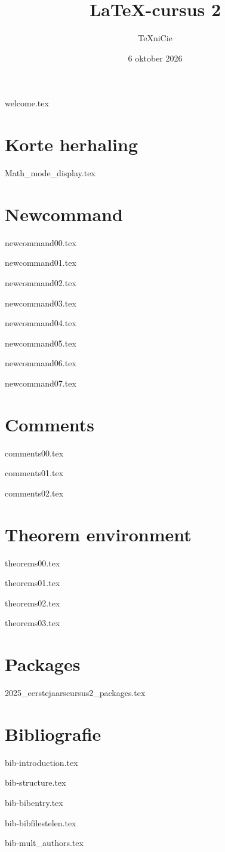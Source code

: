 \documentclass[allauthors,dutch]{../../../cursuspresentatie3}
\title{\LaTeX{}-cursus 2}
\author{\TeX niCie}
\date{6 oktober 2026}
\def\importslidei#1#2{%
	{#2}
}
\def\importslideh#1#2{%
	{#2}
}
\def\importslidej#1#2{%
	{#2}
}
\def\importslidey#1#2{%
	{#2}
}
\begin{document}
\importslideh{beginners_NL}{welcome.tex}

\section{Korte herhaling}
\def\placetarget{\hypertarget{herhaling}{}}

\importslidei{2025-eerstejaars_cursus_1}{Math_mode_display.tex}

\section{Newcommand}
\def\placetarget{\hypertarget{newcommand}{}}

\importslidey{2026-eerstejaars_cursus_2}{newcommand00.tex}
\importslidey{2026-eerstejaars_cursus_2}{newcommand01.tex}
\importslidey{2026-eerstejaars_cursus_2}{newcommand02.tex}
\importslidey{2026-eerstejaars_cursus_2}{newcommand03.tex}
\importslidey{2026-eerstejaars_cursus_2}{newcommand04.tex}
\importslidey{2026-eerstejaars_cursus_2}{newcommand05.tex}
\importslidey{2026-eerstejaars_cursus_2}{newcommand06.tex}
\importslidey{2026-eerstejaars_cursus_2}{newcommand07.tex}

\section{Comments}
\def\placetarget{\hypertarget{comments}{}}

\importslidey{2026-eerstejaars_cursus_2}{comments00.tex}
\importslidey{2026-eerstejaars_cursus_2}{comments01.tex}
\importslidey{2026-eerstejaars_cursus_2}{comments02.tex}

\section{Theorem environment}
\def\placetarget{\hypertarget{theorem_environment}{}}
\importslidey{2026-eerstejaars_cursus_2}{theorems00.tex}
\importslidey{2026-eerstejaars_cursus_2}{theorems01.tex}
\importslidey{2026-eerstejaars_cursus_2}{theorems02.tex}
\importslidey{2026-eerstejaars_cursus_2}{theorems03.tex}

\section{Packages}
\def\placetarget{\hypertarget{packages}{}}
\importslidej{cursus2}{2025_eerstejaarscursus2_packages.tex}

\section{Bibliografie}
\def\placetarget{\hypertarget{biblio}{}}
\importslideh{bib}{bib-introduction.tex}
\importslideh{bib}{bib-structure.tex}
\importslideh{bib}{bib-bibentry.tex} 
\importslideh{bib}{bib-bibfilestelen.tex}
\importslideh{bib}{bib-mult_authors.tex}
\end{document}
